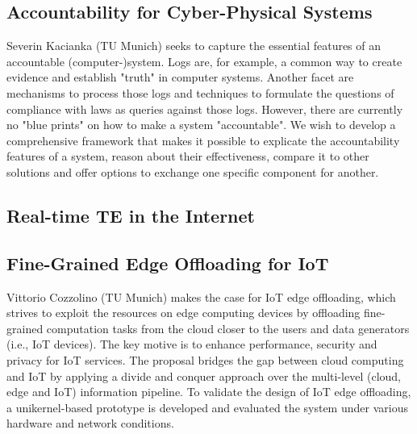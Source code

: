\subsection{Accountability for Cyber-Physical Systems}

Severin Kacianka (TU Munich) seeks to capture the essential features of an
accountable (computer-)system.  Logs are, for example, a common way to create
evidence and establish  "truth" in computer systems. Another facet are
mechanisms to process those logs and techniques to formulate the questions of
compliance with laws as queries against those logs.  However, there are
currently no "blue prints" on how to make a system "accountable". We wish to
develop a comprehensive framework that makes it possible to explicate the
accountability features of a system, reason about their effectiveness, compare
it to other solutions and offer options to exchange one specific component for
another.


\subsection{Real-time TE in the Internet}


\subsection{Fine-Grained Edge Offloading for IoT}

Vittorio Cozzolino (TU Munich) makes the case for \ac{IoT} edge offloading,
which strives to exploit the resources on edge computing devices by offloading
fine-grained computation tasks from the cloud closer to the users and data
generators (i.e., IoT devices). The key motive is to enhance performance,
security and privacy for IoT services. The proposal bridges the gap between
cloud computing and IoT by applying a divide and conquer approach over the
multi-level (cloud, edge and IoT) information pipeline.  To validate the
design of IoT edge offloading, a unikernel-based prototype is developed and
evaluated the system under various hardware and network conditions.
